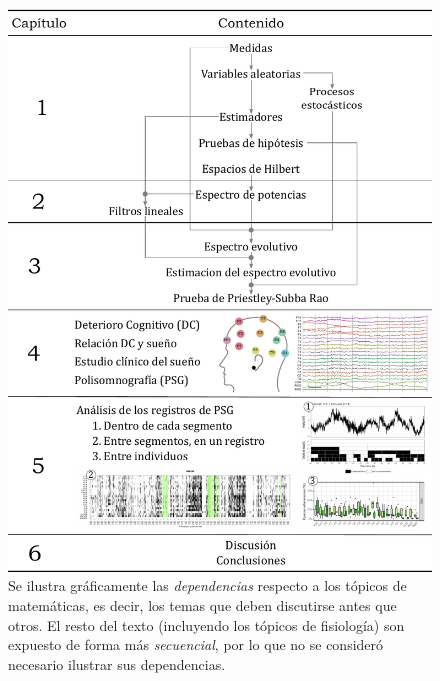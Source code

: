 \documentclass[12pt,letterpaper,draft]{book}
\begin{document}
\begin{figure}
\centering
\includegraphics[width=.9\textwidth]{./estructura_texto_v2.pdf}
\caption[Estructura de la tesis]{Se ilustra gráficamente las \textit{dependencias} respecto a los tópicos de matemáticas, es decir, los temas que deben discutirse antes que otros. El resto del texto (incluyendo los tópicos de fisiología) son expuesto de forma más \textit{secuencial}, por lo que no se consideró necesario ilustrar sus dependencias.}
\label{intro:estructura}
\end{figure}


\end{document}
